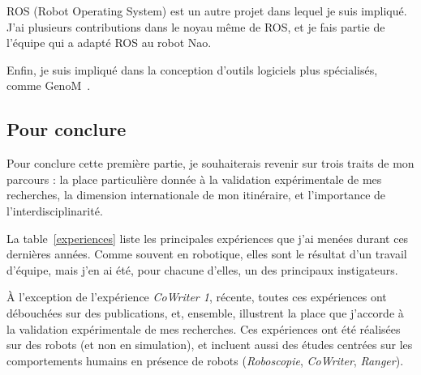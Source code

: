 \documentclass[a4paper]{article}
\begin{document}
ROS (Robot Operating System) est un autre projet dans lequel je suis impliqué.
J'ai plusieurs contributions dans le noyau même de ROS, et je fais partie de
l'équipe qui a adapté ROS au robot Nao.

Enfin, je suis impliqué dans la conception d'outils logiciels plus spécialisés,
comme GenoM~\cite{mallet2010genom3}.

\subsection{Pour conclure}

Pour conclure cette première partie, je souhaiterais revenir sur trois traits de
mon parcours : la place particulière donnée à la validation expérimentale de mes recherches, la dimension internationale de mon itinéraire, et l'importance de
l'interdisciplinarité.

La table~\ref{experiences} liste les principales expériences que j'ai menées
durant ces dernières années. Comme souvent en robotique, elles sont le résultat
d'un travail d'équipe, mais j'en ai été, pour chacune d'elles, un des
principaux instigateurs.

À l'exception de l'expérience \emph{CoWriter 1}, récente, toutes ces expériences
ont débouchées sur des publications, et, ensemble, illustrent la place que
j'accorde à la validation expérimentale de mes recherches. Ces expériences ont
été réalisées sur des robots (et non en simulation), et incluent aussi des
études centrées sur les comportements humains en présence de robots
(\emph{Roboscopie}, \emph{CoWriter}, \emph{Ranger}).
\end{document}
